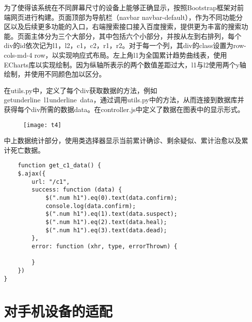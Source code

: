 为了使得该系统在不同屏幕尺寸的设备上能够正确显示，按照Bootstrap框架对前端网页进行构建。页面顶部为导航栏（navbar navbar-default），作为不同功能分区以及后续更多功能的入口，右端搜索接口接入百度搜索，提供更为丰富的搜索功能。页面主体分为三个大部分，其中包括六个小部分，并按从左到右排列，每个div的id依次记为l1，l2，c1，c2，r1，r2。对于每一个列，其div的class设置为row-cols-md-4 row，以实现响应式布局。左上角l1为全国累计趋势曲线表，使用ECharts库以实现绘制。因为纵轴所表示的两个数值差距过大，l1与l2使用两个y轴绘制，并使用不同颜色加以区分。

在utils.py中，定义了每个div获取数据的方法，例如getunderline{~}l1underline{~}data，通过调用utils.py中的方法，从而连接到数据库并获得每个div所需的数据data。在controller.js中定义了数据在图表中的显示形式。

\begin{figure}[H]
    \centering
    \texttt{[image: t4]}
    \label{fig:t4}
\end{figure}

中上数据统计部分，使用类选择器显示当前累计确诊、剩余疑似、累计治愈以及累计死亡数据。

\begin{lstlisting}
    function get_c1_data() {
    $.ajax({
        url: "/c1",
        success: function (data) {
            $(".num h1").eq(0).text(data.confirm);
            console.log(data.confirm);
            $(".num h1").eq(1).text(data.suspect);
            $(".num h1").eq(2).text(data.heal);
            $(".num h1").eq(3).text(data.dead);
        },
        error: function (xhr, type, errorThrown) {

        }
    })
}
\end{lstlisting}


\section{对手机设备的适配}

